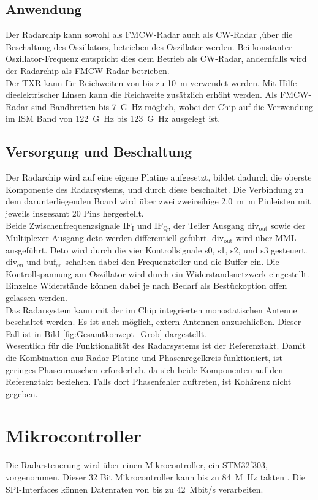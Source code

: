\subsection{Anwendung}
Der Radarchip kann sowohl als FMCW-Radar auch als CW-Radar ,über die Beschaltung des Oszillators, betrieben des Oszillator werden. Bei konstanter Oszillator-Frequenz entspricht dies dem Betrieb als CW-Radar, andernfalls wird der Radarchip als FMCW-Radar betrieben. \\
Der TXR kann für Reichweiten von bis zu \SI{10}{m} verwendet werden. Mit Hilfe dieelektrischer Linsen kann die Reichweite zusätzlich erhöht werden. Als FMCW-Radar sind Bandbreiten bis \SI{7}{G\hertz} möglich, wobei der Chip auf die Verwendung im ISM Band von \SI{122}{G\hertz} bis \SI{123}{G\hertz} ausgelegt ist.
\subsection{Versorgung und Beschaltung}
Der Radarchip wird auf eine eigene Platine aufgesetzt, bildet dadurch die oberste Komponente des Radarsystems, und durch diese beschaltet. Die Verbindung zu dem darunterliegenden Board wird über zwei zweireihige \SI{2.0}{m\metre} Pinleisten mit jeweils insgesamt 20 Pins hergestellt.\\
Beide Zwischenfrequenzsignale $\text{IF}_{\text{I}}$ und $\text{IF}_{\text{Q}}$, der Teiler Ausgang $\text{div}_{\text{out}}$ sowie der Multiplexer Ausgang deto werden differentiell geführt. $\text{div}_{\text{out}}$ wird über MML ausgeführt. Deto wird durch die vier Kontrollsignale s0, s1,  s2, und s3 gesteuert. $\text{div}_{\text{en}}$ und $\text{buf}_{\text{en}}$ schalten dabei den Frequenzteiler und die Buffer ein. Die Kontrollspannung am Oszillator wird durch ein Widerstandsnetzwerk eingestellt. Einzelne Widerstände können dabei je nach Bedarf als Bestückoption offen gelassen werden.\\
Das Radarsystem kann mit der im Chip integrierten monostatischen Antenne beschaltet werden. Es ist auch möglich, extern Antennen anzuschließen. Dieser Fall ist in Bild \ref{fig:Gesamtkonzept_Grob} dargestellt. \\
Wesentlich für die Funktionalität des Radarsystems ist der Referenztakt. Damit die Kombination aus Radar-Platine und Phasenregelkreis funktioniert, ist geringes Phasenrauschen erforderlich, da sich beide Komponenten auf den Referenztakt beziehen. Falls dort Phasenfehler auftreten, ist Kohärenz nicht gegeben.
\section{Mikrocontroller}
Die Radarsteuerung wird über einen Mikrocontroller, ein STM32f303, vorgenommen. Dieser 32 Bit Mikrocontroller kann bis zu \SI{84}{M\hertz} takten . Die SPI-Interfaces können Datenraten von bis zu \SI{42}{Mbit/s} verarbeiten.